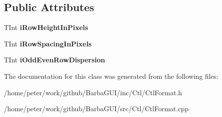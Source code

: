 \subsection*{Public Attributes}
\begin{DoxyCompactItemize}
\item 
\mbox{\label{classCColumnFormat_a21fb9f9e79dfc4383b4cfe6f04faaaf5}} 
T\+Int {\bfseries i\+Row\+Height\+In\+Pixels}
\item 
\mbox{\label{classCColumnFormat_a03f6122f6dbbfff33df186d3ceac4bdf}} 
T\+Int {\bfseries i\+Row\+Spacing\+In\+Pixels}
\item 
\mbox{\label{classCColumnFormat_aff6fe04dd20c8133662d79ca1dd4d76b}} 
T\+Int {\bfseries i\+Odd\+Even\+Row\+Dispersion}
\end{DoxyCompactItemize}


The documentation for this class was generated from the following files\+:\begin{DoxyCompactItemize}
\item 
/home/peter/work/github/\+Barba\+G\+U\+I/inc/\+Ctl/Ctl\+Format.\+h\item 
/home/peter/work/github/\+Barba\+G\+U\+I/src/\+Ctl/Ctl\+Format.\+cpp\end{DoxyCompactItemize}
